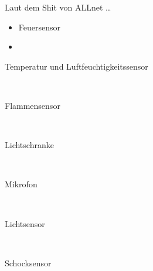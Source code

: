 
Laut dem Shit von ALLnet \cite{111861pd90:online} \ldots
\begin{itemize}
\item Feuersensor
\item
\end{itemize}

\begin{description}
\item[Temperatur und Luftfeuchtigkeitssensor] \hfill \\
	
\item[Flammensensor]\hfill \\
\item[Lichtschranke]\hfill \\
\item[Mikrofon]\hfill \\
\item[Lichtsensor]\hfill \\
\item[Schocksensor]\hfill \\
\end{description}